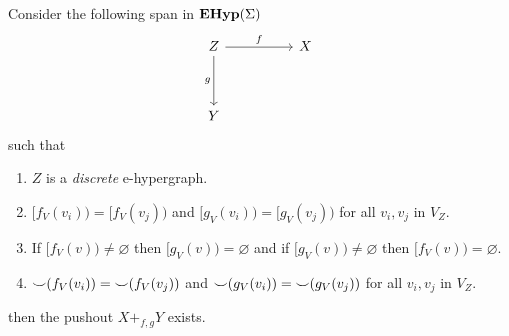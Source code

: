 \begin{theorem}
\label{th:existence_of_pushouts}
Consider the following span in $\mathbf{EHyp}(\Sigma)$
\[\begin{tikzcd}
	Z && X \\
	\\
	Y
	\arrow["f", from=1-1, to=1-3]
	\arrow["g"', from=1-1, to=3-1]
\end{tikzcd}\]
such that
\begin{enumerate}
\label{pushout:assumptions}
    \item $Z$ is a \textit{discrete} e-hypergraph.
    \item \label{assumption:equal_predecessors} $[f_{V}(v_i)) = [f_{V}(v_j))$ and $[g_{V}(v_i)) = [g_{V}(v_j))$ for all $v_{i},v_{j}$ in $V_{Z}$.
    \item \label{assumption:non_ambiguous_predecessors} If $[f_{V}(v)) \not = \varnothing$ then $[g_{V}(v)) = \varnothing$ and if $[g_{V}(v)) \not = \varnothing$ then $[f_{V}(v)) = \varnothing$.
    \item ${\smile}(f_{V}(v_i)) = {\smile}(f_{V}(v_j))$ and ${\smile}(g_{V}(v_i)) = {\smile}(g_{V}(v_j))$ for all $v_i,v_j$ in $V_{Z}$.
\end{enumerate}    
then the pushout $X +_{f,g} Y$ exists.
\end{theorem}
